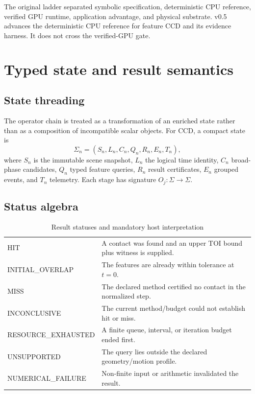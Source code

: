 \documentclass[11pt,a4paper,oneside]{book}
\begin{document}
The original ladder separated symbolic specification, deterministic CPU reference, verified GPU runtime, application advantage, and physical substrate. v0.5 advances the deterministic CPU reference for feature CCD and its evidence harness. It does not cross the verified-GPU gate.

\chapter{Typed state and result semantics}
\section{State threading}

The operator chain is treated as a transformation of an enriched state rather than as a composition of incompatible scalar objects. For CCD, a compact state is
\[
\Sigma_n=(S_n,L_n,C_n,Q_n,R_n,E_n,T_n),
\]
where $S_n$ is the immutable scene snapshot, $L_n$ the logical time identity, $C_n$ broad-phase candidates, $Q_n$ typed feature queries, $R_n$ result certificates, $E_n$ grouped events, and $T_n$ telemetry. Each stage has signature $O_j:\Sigma\rightarrow\Sigma$.

\section{Status algebra}

\begin{table}[H]
\centering
\caption{Result statuses and mandatory host interpretation}
\begin{tabularx}{\textwidth}{>{\ttfamily}p{}X}
\toprule
HIT & A contact was found and an upper TOI bound plus witness is supplied.\\
INITIAL\_OVERLAP & The features are already within tolerance at $t=0$.\\
MISS & The declared method certified no contact in the normalized step.\\
INCONCLUSIVE & The current method/budget could not establish hit or miss.\\
RESOURCE\_EXHAUSTED & A finite queue, interval, or iteration budget ended first.\\
UNSUPPORTED & The query lies outside the declared geometry/motion profile.\\
NUMERICAL\_FAILURE & Non-finite input or arithmetic invalidated the result.\\
\bottomrule
\end{tabularx}
\end{table}
\end{document}
